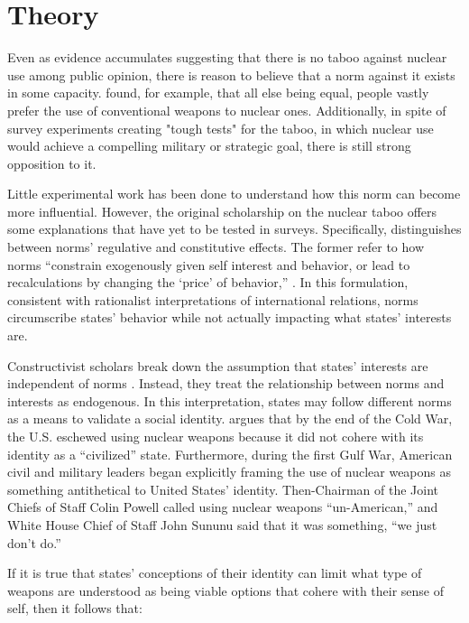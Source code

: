 \documentclass[12pt]{article}
\begin{document}
\section{Theory}
Even as evidence accumulates suggesting that there is no taboo against nuclear use among public opinion, there is reason to believe that a norm against it exists in some capacity. \citet{press_atomic_2013} found, for example, that all else being equal, people vastly prefer the use of conventional weapons to nuclear ones. Additionally, in spite of survey experiments creating "tough tests" for the taboo, in which nuclear use would achieve a compelling military or strategic goal, there is still strong opposition to it.

Little experimental work has been done to understand how this norm can become more influential. However, the original scholarship on the nuclear taboo offers some explanations that have yet to be tested in surveys. Specifically, \citet{tannewald_nuclear_2007} distinguishes between norms' regulative and constitutive effects. The former refer to how norms ``constrain exogenously given self interest and behavior, or lead to recalculations by changing the ‘price’ of behavior,'' \citep[~45]{tannewald_nuclear_2007}. In this formulation, consistent with rationalist interpretations of international relations, norms circumscribe states' behavior while not actually impacting what states' interests are. 

Constructivist scholars break down the assumption that states' interests are independent of norms \citep{wendt_social_1999}. Instead, they treat the relationship between norms and interests as endogenous. In this interpretation, states may follow different norms as a means to validate a social identity. \citet{tannewald_nuclear_2007} argues that by the end of the Cold War, the U.S. eschewed using nuclear weapons because it did not cohere with its identity as a ``civilized'' state. Furthermore, during the first Gulf War, American civil and military leaders began explicitly framing the use of nuclear weapons as something antithetical to United States' identity. Then-Chairman of the Joint Chiefs of Staff Colin Powell called using nuclear weapons ``un-American,'' and White House Chief of Staff John Sununu said that it was something, ``we just don't do.''

If it is true that states' conceptions of their identity can limit what type of weapons are understood as being viable options that cohere with their sense of self, then it follows that:
\end{document}

